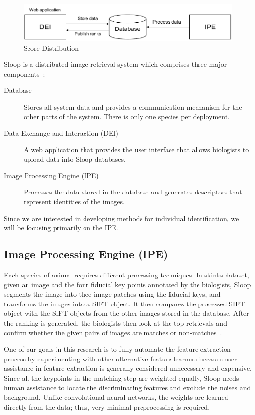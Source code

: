 \begin{figure}[htb]
  \centering
  \includegraphics[width=\textwidth]{sloop/system}
  \caption{Score Distribution}
  \label{fig:sloop_overview} %
\end{figure}

Sloop is a distributed image retrieval system which comprises three major
components~\cite{sloop14,sloop15,sloopdocs}: \begin{description} \item[Database]
Stores all system data and provides a communication mechanism for the other
parts of the system. There is only one species per deployment.  \item[Data
Exchange and Interaction (DEI)] A web application that provides the user
interface that allows biologists to upload data into Sloop databases.
\item[Image Processing Engine (IPE)] Processes the data stored in the database
and generates descriptors that represent identities of the images.
\end{description} Since we are interested in developing methods for individual
identification, we will be focusing primarily on the IPE.

\subsection{Image Processing Engine (IPE)}

Each species of animal requires different processing techniques.  In skinks
dataset, given an image and the four fiducial key points annotated by the
biologists, Sloop segments the image into thee image patches using the fiducial
keys, and transforms the images into a SIFT object. It then compares the
processed SIFT object with the SIFT objects from the other images stored in the
database. After the ranking is generated, the biologists then look at the top
retrievals and confirm whether the given pairs of images are matches or
non-matches~\cite{sloop14,sloop15}.

One of our goals in this research is to fully automate the feature extraction
process by experimenting with other alternative feature learners because user
assistance in feature extraction is generally considered unnecessary and
expensive. Since all the keypoints in the matching step are weighted equally,
Sloop needs human assistance to locate the discriminating features and exclude
the noises and background. Unlike convolutional neural networks, the weights are
learned directly from the data; thus, very minimal preprocessing is required.

